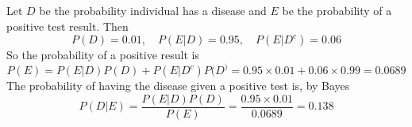 Let $D$ be the probability individual has a disease and $E$ be the probability of a positive test result. Then
\[
P(D)=0.01,\quad P(E|D)=0.95,\quad P(E|D^c)=0.06
\]
So the probability of a positive result is
\[
P(E)=P(E|D)P(D)+P(E|D^c)P(D^)=0.95\times 0.01+0.06\times0.99=0.0689
\]
The probability of having the disease given a positive test is, by Bayes
\[
P(D|E)=\frac{P(E|D)P(D)}{P(E)}=\frac{0.95\times0.01}{0.0689}=0.138
\]

